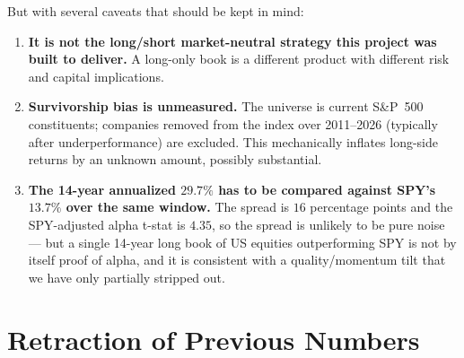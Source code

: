 \documentclass[11pt,a4paper]{article}
\begin{document}
But with several caveats that should be kept in mind:
\begin{enumerate}[noitemsep]
    \item \textbf{It is not the long/short market-neutral strategy this project was built to deliver.} A long-only book is a different product with different risk and capital implications.
    \item \textbf{Survivorship bias is unmeasured.} The universe is current S\&P~500 constituents; companies removed from the index over 2011--2026 (typically after underperformance) are excluded. This mechanically inflates long-side returns by an unknown amount, possibly substantial.
    \item \textbf{The 14-year annualized $29.7\%$ has to be compared against SPY's $13.7\%$ over the same window.} The spread is $16$ percentage points and the SPY-adjusted alpha t-stat is $4.35$, so the spread is unlikely to be pure noise --- but a single 14-year long book of US equities outperforming SPY is not by itself proof of alpha, and it is consistent with a quality/momentum tilt that we have only partially stripped out.
\end{enumerate}

\section{Retraction of Previous Numbers}
\label{sec:retraction}
\end{document}
